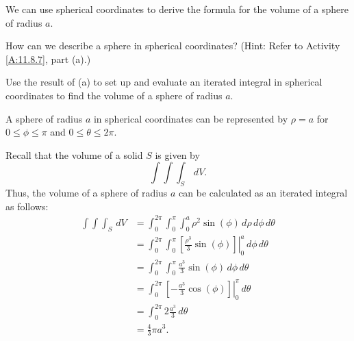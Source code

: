 \begin{activity} \label{A:11.8.9} We can use spherical coordinates to derive the formula for the volume of a sphere of radius $a$.
    \ba
    \item How can we describe a sphere in spherical coordinates? (Hint: Refer to Activity \ref{A:11.8.7}, part (a).)



    \item Use the result of (a) to set up and evaluate an iterated integral in spherical coordinates to find the volume of a sphere of radius $a$.


    \ea

\end{activity}
\begin{smallhint}

\end{smallhint}
\begin{bighint}

\end{bighint}
\begin{activitySolution}
\ba
\item A sphere of radius $a$ in spherical coordinates can be represented by $\rho=a$ for $0 \leq \phi \leq \pi$ and $0 \leq \theta \leq 2\pi$. 

\item Recall that the volume of a solid $S$ is given by
\[\int \int \int_S \, dV.\]
Thus, the volume of a sphere of radius $a$ can be calculated as an iterated integral as follows:
\begin{align*}
\int \int \int_S \, dV &= \int_0^{2\pi} \int_0^{\pi} \int_0^{a} \rho^2 \sin(\phi) \, d\rho \, d\phi \, d\theta \\
	&= \int_0^{2\pi} \int_0^{\pi} \left. \left[\frac{\rho^3}{3} \sin(\phi) \right]\right|_0^a  \, d\phi \, d\theta \\
	&= \int_0^{2\pi} \int_0^{\pi} \frac{a^3}{3} \sin(\phi) \, d\phi \, d\theta \\
	&= \int_0^{2\pi} \left. \left[-\frac{a^3}{3} \cos(\phi)\right]\right|_0^{\pi} \, d\theta \\
	&= \int_0^{2\pi} 2\frac{a^3}{3} \, d\theta \\
	&= \frac{4}{3}\pi a^3.
\end{align*}
\ea
\end{activitySolution}
\aftera
